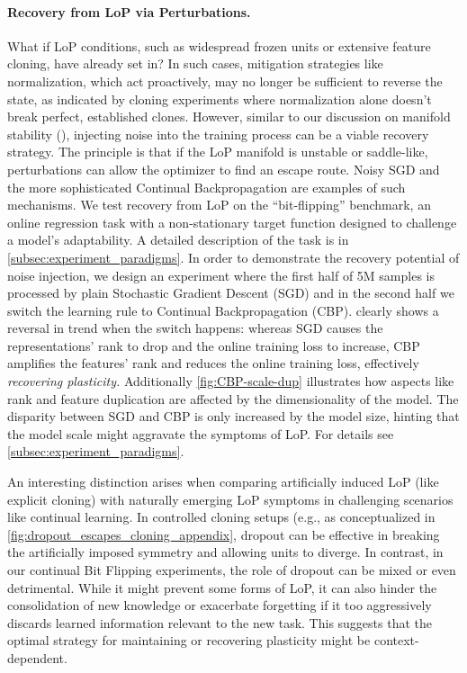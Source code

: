 \documentclass{article}
\numberwithin{figure}{section}
\begin{document}
\paragraph{Recovery from LoP via Perturbations.}
What if LoP conditions, such as widespread frozen units or extensive feature cloning, have already set in? In such cases, mitigation strategies like normalization, which act proactively, may no longer be sufficient to reverse the state, as indicated by cloning experiments where normalization alone doesn't break perfect, established clones. However, similar to our discussion on manifold stability (), injecting noise into the training process can be a viable recovery strategy.
The principle is that if the LoP manifold is unstable or saddle-like, perturbations can allow the optimizer to find an escape route. Noisy SGD and the more sophisticated Continual Backpropagation \citep{dohare2024loss} are examples of such mechanisms. 
We test recovery from LoP on the ``bit-flipping'' benchmark, an online regression task with a non-stationary target function designed to challenge a model's adaptability. A detailed description of the task is in \cref{subsec:experiment_paradigms}.
In order to demonstrate the recovery potential of noise injection, we design an experiment where the first half of 5M samples is processed by plain Stochastic Gradient Descent (SGD) and in the second half we switch the learning rule to Continual Backpropagation (CBP). 
 clearly shows a reversal in trend when the switch happens: whereas SGD causes the representations' rank to drop and the online training loss to increase, CBP amplifies the features' rank and reduces the online training loss, effectively \emph{recovering plasticity.}
Additionally \cref{fig:CBP-scale-dup} illustrates how aspects like rank and feature duplication are affected by the dimensionality of the model. The disparity between SGD and CBP is only increased by the model size, hinting that the model scale might aggravate the symptoms of LoP. For details see \cref{subsec:experiment_paradigms}.  

An interesting distinction arises when comparing artificially induced LoP (like explicit cloning) with naturally emerging LoP symptoms in challenging scenarios like continual learning. In controlled cloning setups (e.g., as conceptualized in \cref{fig:dropout_escapes_cloning_appendix}, dropout can be effective in breaking the artificially imposed symmetry and allowing units to diverge. In contrast, in our continual Bit Flipping experiments, the role of dropout can be mixed or even detrimental. While it might prevent some forms of LoP, it can also hinder the consolidation of new knowledge or exacerbate forgetting if it too aggressively discards learned information relevant to the new task. This suggests that the optimal strategy for maintaining or recovering plasticity might be context-dependent.
\end{document}
